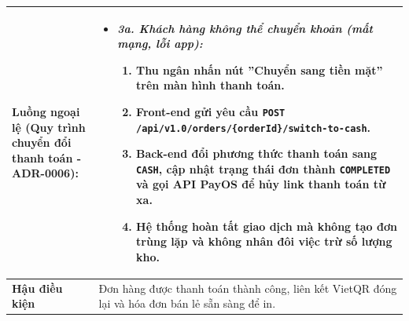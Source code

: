 \begin{table}[htbp]
\begin{tabularx}{\textwidth}{|l|X|}
\textbf{Luồng ngoại lệ (Quy trình chuyển đổi thanh toán - ADR-0006):} & 
\begin{itemize}[leftmargin=*, nosep]
    \item \textit{3a. Khách hàng không thể chuyển khoản (mất mạng, lỗi app):} 
    \begin{enumerate}[label=\alph*., leftmargin=*]
        \item Thu ngân nhấn nút ''Chuyển sang tiền mặt'' trên màn hình thanh toán.
        \item Front-end gửi yêu cầu \texttt{POST /api/v1.0/orders/\{orderId\}/switch-to-cash}.
        \item Back-end đổi phương thức thanh toán sang \texttt{CASH}, cập nhật trạng thái đơn thành \texttt{COMPLETED} và gọi API PayOS để hủy link thanh toán từ xa.
        \item Hệ thống hoàn tất giao dịch mà không tạo đơn trùng lặp và không nhân đôi việc trừ số lượng kho.
    \end{enumerate}
\end{itemize} \\ \hline
\textbf{Hậu điều kiện} & Đơn hàng được thanh toán thành công, liên kết VietQR đóng lại và hóa đơn bán lẻ sẵn sàng để in. \\ \hline
\end{tabularx}
\end{table}

